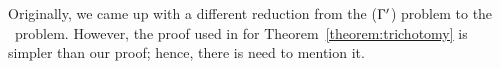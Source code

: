 Originally, we came up with a different reduction from the \ccsp(\(\Gamma'\)) problem
to the \cds\ problem. However, the proof used in \cite{Trichotomy} for
Theorem~\ref{theorem:trichotomy} is simpler than our proof; hence, there is need to mention it.
\begin{comment}
The reduction uses Theorem~\ref{theorem:majority} to break arbitrary relation to binary relation.
A function \(m: D^3\to D\) is said to be a \emph{majority function}, if for any \(x,y\in D\) we have
\(m(x,x,y) = m(x,y,x) = m(y, x, x) = x\)\@. We denote the projection of \mR\ on coordinates \(i\) and
 \(j\) by \(R_{1,2}\) and projections of \mR\ on coordinates from \(i\) to \(j\) by \(R_{i-j}\)\@.


\begin{theorem} [Bergman's Double-projection Theorem (Unpublished)]\label{theorem:majority}
Let \mR\ be a relation of arity \mn\ on domain \(D\) and
\(m\) be a majority function on the same domain.
If \mm\ is a polymorphism for \mR, then \mR\ can be expressed by all 
its binary projections as \(R(x_1,\dotsc,x_n) = \bigwedge_{i,j} R_{i,j}(x_i,x_j)\)\@.
\end{theorem}

We provide our own proof for this theorem.

\begin{proof}
It is trivial that \mR\ implies all its binary projection. We  prove that
binary projections of \mR\ implies \mR\@.
We proceed by induction on \(t\) the arity of the relation \mR\@.
For \(t=2\), the statement is trivial. We show that
if the statement is true for \(t=n-1\) it is also true for \(t=n\)\@.
We want to prove \(\bigwedge_{i,j} R_{i,j}(x_i,x_j) \implies R(x_1,\dotsc, x_n)\).
By induction hypothesis \(R_{1-(n-1)}(x_1,\dotsc,x_{n-1})\) and \(R_{2-n}(x_2,\dots,x_n)\)
is true because \(R_{1-(n-1)}\) and \(R_{2-n})\) are closed under \mm\@.
By hypothesis, \(R_{1,n}(x_1,x_n)\) is also true. Since these relations are projection of \mR,
there are \(y_1,\dotsc,y_n \in D\) such that 
\(R(x_1,\dotsc,x_{n-1},y_n)\), \(R(y_1,x_2,\dotsc,x_n)\), and \(R(x_1,y_2,\dotsc,y_{n-1},x_n)\)
are true. Since \mm\ is a polymorphism of \mR, \(R(x_1,\dotsc,x_n)\) is true.
\end{proof}

For every monotone
relation, we can find a majority projection using \(\vee\) and \(\wedge\) operators. One
example would be \(m(x,y,z)=(x \vee y) \wedge (x \vee z) \wedge (y \vee z)\)\@. 
Thus, every instance of the \ccsp(\(\relset'\)) problem can be parsimoniously reduced to
a \ccsp(\\)) instance, where \(\relset''\) is the binary monotone constraint language.
Finally, \ccsp(\(\relset''\)
\end{comment}

